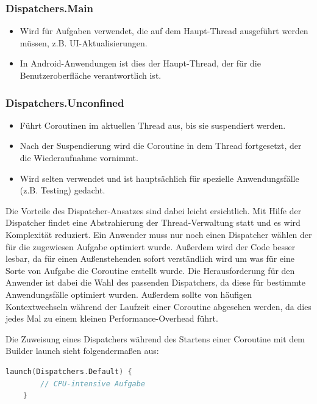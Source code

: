 \documentclass[fontsize=12pt,paper=a4,twoside=semi,parskip=half-,headsepline,headinclude]{scrreprt}
\begin{document}
\subsubsection{Dispatchers.Main}

\begin{itemize}
	\item Wird für Aufgaben verwendet, die auf dem Haupt-Thread ausgeführt werden müssen, z.B. UI-Aktualisierungen.
	\item In Android-Anwendungen ist dies der Haupt-Thread, der für die Benutzeroberfläche verantwortlich ist.
\end{itemize}

\subsubsection{Dispatchers.Unconfined}

\begin{itemize}
	\item Führt Coroutinen im aktuellen Thread aus, bis sie suspendiert werden.
	\item Nach der Suspendierung wird die Coroutine in dem Thread fortgesetzt, der die Wiederaufnahme vornimmt.
	\item Wird selten verwendet und ist hauptsächlich für spezielle Anwendungsfälle (z.B. Testing) gedacht.
\end{itemize}

Die Vorteile des Dispatcher-Ansatzes sind dabei leicht ersichtlich. Mit Hilfe der Dispatcher findet eine Abstrahierung der Thread-Verwaltung statt und es wird Komplexität reduziert. Ein Anwender muss nur noch einen Dispatcher wählen der für die zugewiesen Aufgabe optimiert wurde. Außerdem wird der Code besser lesbar, da für einen Außenstehenden sofort verständlich wird um was für eine Sorte von Aufgabe die Coroutine erstellt wurde. Die Herausforderung für den Anwender ist dabei die Wahl des passenden Dispatchers, da diese für bestimmte Anwendungsfälle optimiert wurden. Außerdem sollte von häufigen Kontextwechseln während der Laufzeit einer Coroutine abgesehen werden, da dies jedes Mal zu einem kleinen  Performance-Overhead führt.

Die Zuweisung eines Dispatchers während des Startens einer Coroutine mit dem Builder launch sieht folgendermaßen aus:

\begin{lstlisting}[language=Kotlin]
	launch(Dispatchers.Default) {
		// CPU-intensive Aufgabe
	}
\end{lstlisting}
\end{document}
